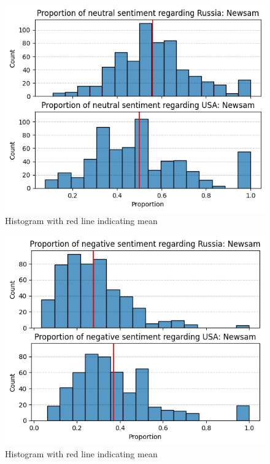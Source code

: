 \documentclass{IEEEtran}
\begin{document}
\begin{figure}
    \centering
    \includegraphics[width=1\linewidth]{figures/sig5.png}
    \caption{Histogram with red line indicating mean}
    \label{fig:neutral_russia_newsam}
\end{figure}


\begin{figure}
    \centering
    \includegraphics[width=1\linewidth]{figures/sig6.png}
    \caption{Histogram with red line indicating mean}
    \label{fig:negative_russia_newsam}
\end{figure}
\end{document}
